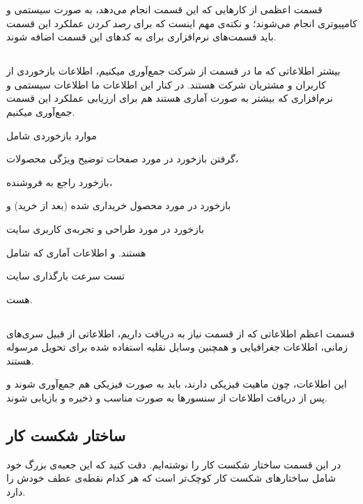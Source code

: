 قسمت اعظمی از کار‌هایی که این قسمت انجام می‌دهد، به صورت سیستمی و کامپیوتری انجام می‌شوند؛ و نکته‌ی مهم اینست که برای \textit{رصد کردن} عملکرد این قسمت باید قسمت‌های نرم‌افزاری برای  به کد‌های این قسمت اضافه شوند. 

\subsection{}\label{ssec:site}
بیشتر اطلاعاتی که ما در قسمت 
از شرکت جمع‌آوری میکنیم، اطلاعات بازخوردی از کاربران و مشتریان شرکت هستند. در کنار این اطلاعات ما اطلاعات سیستمی و نرم‌افزاری که بیشتر به صورت آماری هستند هم برای ارزیابی عملکرد این قسمت جمع‌آوری میکنیم.

موارد بازخوردی شامل
\begin{enumerate*}
\item گرفتن بازخورد در مورد صفحات توضیح ویژگی محصولات،
\item بازخورد راجع به فروشنده،
\item بازخورد در مورد محصول خریداری شده (بعد از خرید) و
\item بازخورد در مورد طراحی و تجربه‌ی کاربری سایت
\end{enumerate*} 
هستند. و اطلاعات آماری که شامل
\begin{enumerate*}
\item تست سرعت بارگذاری سایت
\end{enumerate*}
هست.

\subsection{}\label{ssec:shipment}
قسمت اعظم اطلاعاتی که از قسمت 
نیاز به دریافت داریم، اطلاعاتی از قبیل سری‌های زمانی، اطلاعات جغرافیایی و همچنین وسایل نقلیه استفاده شده برای تحویل مرسوله هستند.

این اطلاعات، چون ماهیت فیزیکی دارند، باید به صورت فیزیکی هم جمع‌آوری شوند و پس از دریافت اطلاعات از سنسور‌‌ها به صورت مناسب و  ذخیره و بازیابی شوند.

\subsection{ساختار شکست کار}
در این قسمت ساختار شکست کار‌ را نوشته‌ایم. دقت کنید که این جعبه‌ی بزرگ خود شامل ساختارهای شکست کار کوچک‌تر است که هر کدام نقطه‌ی عطف خودش را دارد.

